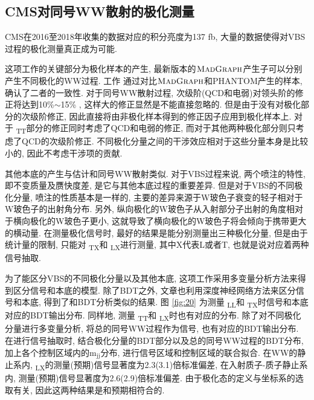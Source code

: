 \documentclass{SCIS2020cn}
\newcommand{\MADGRAPH}{\textsc{MadGraph}\xspace}
\newcommand{\Wboson}{\text{W}}
\newcommand{\mass}{\text{m}}
\begin{document}
\subsection{CMS对同号WW散射的极化测量}

CMS在2016至2018年收集的数据对应的积分亮度为137 fb, 大量的数据使得对VBS过程的极化测量真正成为可能. 

这项工作的关键部分为极化样本的产生, 最新版本的$\MADGRAPH$产生子可以分别产生不同极化的WW过程. 工作 \cite{58} 通过对比$\MADGRAPH$和PHANTOM产生的样本, 确认了二者的一致性. 对于同号WW散射过程, 次级阶(QCD和电弱)对领头阶的修正将达到10\%$\sim$15\% , 这样大的修正显然是不能直接忽略的. 但是由于没有对极化部分的次级阶修正, 因此直接将由非极化样本得到的修正因子应用到极化样本上. 对于 \Wboson\textsubscript{T}\Wboson\textsubscript{T}部分的修正同时考虑了QCD和电弱的修正, 而对于其他两种极化部分则只考虑了QCD的次级阶修正. 不同极化分量之间的干涉效应相对于这些分量本身是比较小的, 因此不考虑干涉项的贡献. 

其他本底的产生与估计和同号WW散射类似. 对于VBS过程来说, 两个喷注的特性, 即不变质量及赝快度差, 是它与其他本底过程的重要差异. 但是对于VBS的不同极化分量, 喷注的性质基本是一样的, 主要的差异来源于W玻色子衰变的轻子相对于W玻色子的出射角分布. 另外, 纵向极化的W玻色子从入射部分子出射的角度相对于横向极化的W玻色子更小, 这就导致了横向极化的W玻色子将会倾向于携带更大的横动量. 在测量极化信号时, 最好的结果是能分别测量出三种极化分量, 但是由于统计量的限制, 只能对 \Wboson\textsubscript{T}\Wboson\textsubscript{X}和 \Wboson\textsubscript{L}\Wboson\textsubscript{X}进行测量, 其中X代表L或者T, 也就是说对应着两种信号抽取. 

为了能区分VBS的不同极化分量以及其他本底, 这项工作采用多变量分析方法来得到区分信号和本底的模型. 除了BDT之外, 文章也利用深度神经网络方法来区分信号和本底, 得到了和BDT分析类似的结果. 图 \ref{fig:20} 为测量 \Wboson\textsubscript{L}\Wboson\textsubscript{L}和 \Wboson\textsubscript{T}\Wboson\textsubscript{X}时信号和本底对应的BDT输出分布. 同样地, 测量 \Wboson\textsubscript{T}\Wboson\textsubscript{T}和 \Wboson\textsubscript{L}\Wboson\textsubscript{X}时也有对应的分布. 除了对不同极化分量进行多变量分析, 将总的同号WW过程作为信号, 也有对应的BDT输出分布. 在进行信号抽取时, 结合极化分量的BDT部分以及总的同号WW过程的BDT分布, 加上各个控制区域内的$\mass_{\text{jj}}$分布, 进行信号区域和控制区域的联合拟合. 在WW的静止系内, \Wboson\textsubscript{L}\Wboson\textsubscript{X}的测量(预期)信号显著度为2.3(3.1)倍标准偏差, 在入射质子-质子静止系内, 测量(预期)信号显著度为2.6(2.9)倍标准偏差. 由于极化态的定义与坐标系的选取有关, 因此这两种结果是和预期相符合的. 
\end{document}
